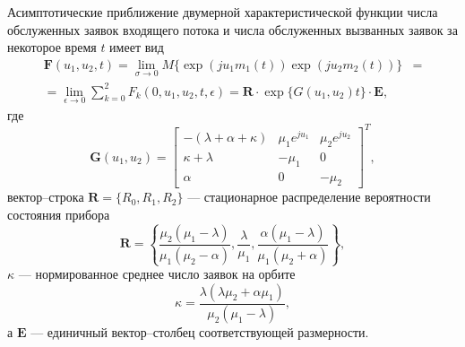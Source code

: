 \begin{theorem}
	Асимптотические приближение двумерной характеристической функции числа обслуженных заявок входящего потока и числа обслуженных вызванных заявок за некоторое время $t$ имеет вид
	\begin{equation*} \label{theorem_twodim}
		\begin{split}
			\boldsymbol{F}(u_{1},u_{2},t) =  \lim_{\sigma \xrightarrow{} 0} M\{\exp(ju_{1}m_{1}(t))\exp(ju_{2}m_{2}(t))\} &= 
			\\
			= \lim_{\epsilon \xrightarrow{} 0} \sum_{k=0}^{2}F_{k}(0,u_{1},u_{2},t,\epsilon) = \boldsymbol{R} \cdot \exp\{G(u_{1},u_{2})t\} \cdot \boldsymbol{E},
		\end{split}
	\end{equation*}
	где 
	\begin{equation*}
		\boldsymbol{G}(u_{1},u_{2})=\begin{bmatrix}
			-(\lambda + \alpha + \kappa) & \mu_{1}e^{ju_{1}} &  \mu_{2}e^{ju_{2}}\\
			\kappa+\lambda & -\mu_{1} & 0\\
			\alpha & 	0 &	-\mu_{2}
		\end{bmatrix}^{T},
	\end{equation*}
	вектор--строка $\boldsymbol{R}=\{R_{0},R_{1},R_{2}\}$ --- стационарное распределение вероятности состояния прибора
	\begin{equation*}
		\boldsymbol{R}=\left\{\frac{\mu_{2}(\mu_{1} - \lambda)}{\mu_{1}(\mu_{2} - \alpha)},\frac{\lambda}{\mu_{1}},\frac{\alpha(\mu_{1} - \lambda)}{\mu_{1}(\mu_{2} + \alpha)}\right\},
	\end{equation*}
	$\kappa$ --- нормированное среднее число заявок на орбите
	\begin{equation*}
		\kappa = \frac{\lambda(\lambda \mu_{2} + \alpha \mu_{1})}{\mu_{2}(\mu_{1} - \lambda)},
	\end{equation*}
	а $\boldsymbol{E}$ --- единичный вектор--столбец соответствующей размерности.
\end{theorem}
